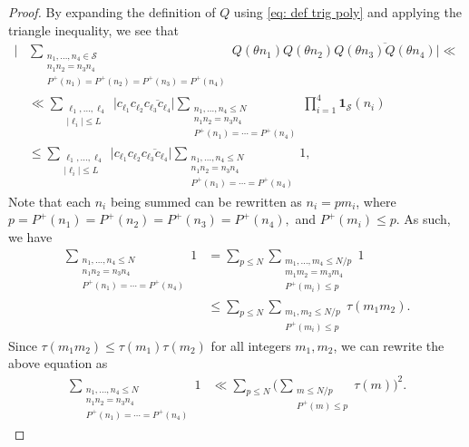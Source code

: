 \documentclass[12pt]{amsart}
\renewcommand{\le}{\leqslant}
\renewcommand{\leq}{\leqslant}
\numberwithin{equation}{section}
\theoremstyle{plain}
\theoremstyle{definition}
\renewcommand{\l}{\ell}
\newcommand{\CS}{\mathcal{S}}
\begin{document}
	\begin{proof}
		By expanding the definition of $Q$ using \eqref{eq: def trig poly} and applying the triangle inequality, we see that
		\begin{align}
			\label{eq: check cond 3 1} \bigg|&\sum_{\substack{n_1,\dots,n_4 \in \CS \\ n_1n_2=n_3n_4 \\ P^+(n_1)=P^+(n_2) = P^+(n_3) = P^+(n_4)}} Q(\theta n_1)Q(\theta n_2)\overline{Q(\theta n_3)Q(\theta n_4)}\bigg| \ll \\ &\ll \sum_{\substack{\l_1,\dots,\l_4 \\ |\l_i| \leq L}} \big|c_{\l_1}c_{\l_2}\overline{c_{\l_3}c_{\l_4}}\big| \sum_{\substack{n_1,\dots,n_4 \leq N  \\ n_1n_2=n_3n_4 \\ P^+(n_1)=\cdots= P^+(n_4)}} \prod_{i = 1}^4\bm{1}_{\CS}(n_i) \nonumber \\
			&\le \sum_{\substack{\l_1,\dots,\l_4 \\ |\l_i| \leq L}} \big|c_{\l_1}c_{\l_2}\overline{c_{\l_3}c_{\l_4}}\big| \sum_{\substack{n_1,\dots,n_4 \leq N  \\ n_1n_2=n_3n_4 \\ P^+(n_1)=\cdots= P^+(n_4)}}1, \nonumber
		\end{align}
		Note that each $n_i$ being summed can be rewritten as $n_i = pm_i$, where $p = P^+(n_1) = P^+(n_2) = P^+(n_3) = P^+(n_4),$ and $P^+(m_i) \leq p$. As such, we have
		\begin{align*}
			\sum_{\substack{n_1,\dots,n_4 \leq N  \\ n_1n_2=n_3n_4 \\ P^+(n_1)=\cdots= P^+(n_4)}}1 &= \sum_{p \leq N} \sum_{\substack{m_1,\dots,m_4 \leq N/p \\ m_1m_2=m_3m_4 \\ P^+(m_i) \leq p}}1\\
			&\le \sum_{p \leq N} \sum_{\substack{m_1,m_2 \leq N/p \\ P^+(m_i) \leq p}}\tau(m_1m_2).
		\end{align*}
		Since $\tau(m_1m_2)\le \tau(m_1)\tau(m_2)$ for all integers $m_1,m_2$, we can rewrite the above equation as
		\begin{align*}
			\sum_{\substack{n_1,\dots,n_4 \leq N  \\ n_1n_2=n_3n_4 \\ P^+(n_1)=\cdots= P^+(n_4)}}1 &\ll  \sum_{p \leq N} \bigg(\sum_{\substack{m \le N/p\\ P^+(m) \leq p}}\tau(m) \bigg)^2.

\end{align*}
\end{proof}
\end{document}
